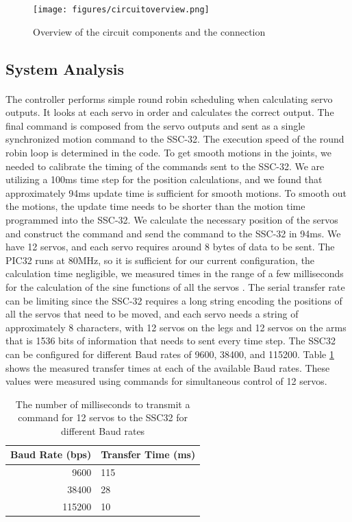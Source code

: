 \documentclass[titlepage,letterpaper,12pt]{article}
\begin{document}
\begin{figure}
    \centering
    \texttt{[image: figures/circuitoverview.png]}
    \caption{Overview of the circuit components and the connection}
    \label{circuit}
\end{figure}

\subsection{System Analysis}
\paragraph{}The controller performs simple round robin scheduling when
calculating servo outputs. It looks at each servo in order and calculates the
correct output. The final command is composed from the servo outputs and sent as
a single synchronized motion command to the SSC-32. The execution speed of the
round robin loop is determined in the code. To get smooth motions in the joints,
we needed to calibrate the timing of the commands sent to the SSC-32.
We are utilizing a 100ms time step for the position calculations, and we found
that approximately 94ms update time is sufficient for smooth motions. To smooth
out the motions, the update time needs to be shorter than the motion time
programmed into the SSC-32.  We calculate the necessary position of the servos
and construct the command and send the command to the SSC-32 in 94ms.
We have 12 servos, and each servo requires around 8 bytes of data to be sent.
The PIC32 runs at 80MHz, so it is sufficient for our current configuration, the
calculation time negligible, we measured times in the range of a few
milliseconds for the calculation of the sine functions of all the servos
\cite{pic32data}. The serial transfer rate can be limiting since the SSC-32
requires a long string encoding the positions of all the servos that need to be
moved, and each servo needs a string of approximately 8 characters, with 12
servos on the legs and 12 servos on the arms that is 1536 bits of information
that needs to sent every time step. The SSC32 can be configured for different
Baud rates of 9600, 38400, and 115200. Table \ref{baudtable} shows the measured
transfer times at each of the available Baud rates. These values were measured
using commands for simultaneous control of 12 servos.

\begin{table} [!h]
    \centering
    \begin{tabular}{|r|l|}
        \hline
        Baud Rate (bps) & Transfer Time (ms)\\
        \hline
        9600 & 115 \\
        \hline
        38400 & 28 \\
        \hline
        115200 & 10 \\
        \hline
    \end{tabular}
    \caption{The number of milliseconds to transmit a command for 12 servos to
    the SSC32 for different Baud rates}
    \label{baudtable}
\end{table}
\end{document}
